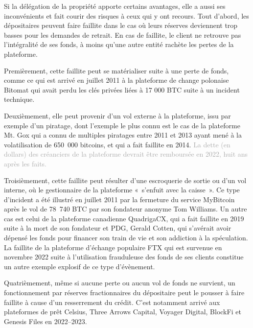 Si la délégation de la propriété apporte certains avantages, elle a aussi ses inconvénients et fait courir des risques à ceux qui y ont recours. Tout d'abord, les dépositaires peuvent faire faillite dans le cas où leurs réserves deviennent trop basses pour les demandes de retrait. En cas de faillite, le client ne retrouve pas l'intégralité de ses fonds, à moins qu'une autre entité rachète les pertes de la plateforme.

Premièrement, cette faillite peut se matérialiser suite à une perte de fonds, comme ce qui est arrivé en juillet 2011 à la plateforme de change polonaise Bitomat qui avait perdu les clés privées liées à 17 000 BTC suite à un incident technique.

Deuxièmement, elle peut provenir d'un vol externe à la plateforme, issu par exemple d'un piratage, dont l'exemple le plus connu est le cas de la plateforme Mt. Gox qui a connu de multiples piratages entre 2011 et 2013 ayant mené à la volatilisation de 650~000 bitcoins, et qui a fait faillite en 2014. \textcolor{darkgray}{La dette (en dollars) des créanciers de la plateforme devrait être remboursée en 2022, huit ans après les faits.}

Troisièmement, cette faillite peut résulter d'une escroquerie de sortie ou d'un vol interne, où le gestionnaire de la plateforme «~s'enfuit avec la caisse~». Ce type d'incident a été illustré en juillet 2011 par la fermeture du service MyBitcoin après le vol de 78~740 BTC par son fondateur anonyme Tom Williams. Un autre cas est celui de la plateforme canadienne QuadrigaCX, qui a fait faillite en 2019 suite à la mort de son fondateur et PDG, Gerald Cotten, qui s'avérait avoir dépensé les fonds pour financer son train de vie et son addiction à la spéculation. La faillite de la plateforme d'échange populaire FTX qui est survenue en novembre 2022 suite à l'utilisation frauduleuse des fonds de ses clients constitue un autre exemple explosif de ce type d'évènement.

Quatrièmement, même si aucune perte ou aucun vol de fonds ne survient, un fonctionnement par réserves fractionnaires du dépositaire peut le pousser à faire faillite à cause d'un resserrement du crédit. C'est notamment arrivé aux plateformes de prêt Celsius, Three Arrows Capital, Voyager Digital, BlockFi et Genesis Files en 2022--2023.

